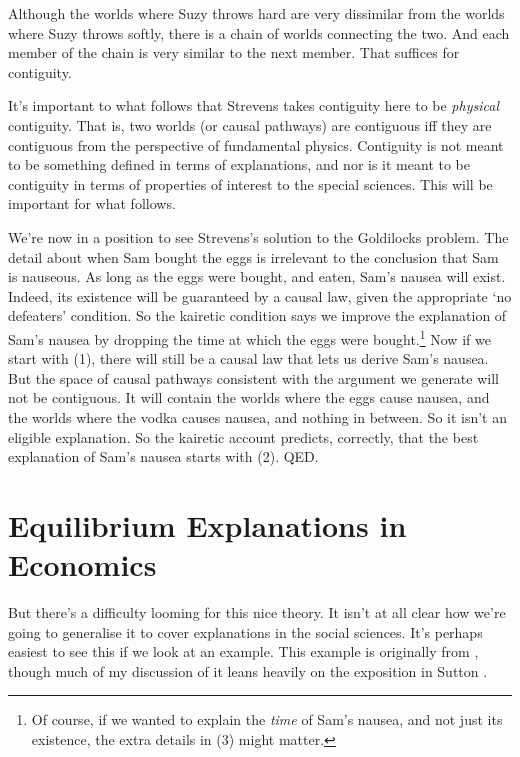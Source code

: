 \noindent Although the worlds where Suzy throws hard are very dissimilar from the worlds where Suzy throws softly, there is a chain of worlds connecting the two. And each member of the chain is very similar to the next member. That suffices for contiguity.

It's important to what follows that Strevens takes contiguity here to be \textit{physical} contiguity. That is, two worlds (or causal pathways) are contiguous iff they are contiguous from the perspective of fundamental physics. Contiguity is not meant to be something defined in terms of explanations, and nor is it meant to be contiguity in terms of properties of interest to the special sciences. This will be important for what follows.

We're now in a position to see Strevens's solution to the Goldilocks problem. The detail about when Sam bought the eggs is irrelevant to the conclusion that Sam is nauseous. As long as the eggs were bought, and eaten, Sam's nausea will exist. Indeed, its existence will be guaranteed by a causal law, given the appropriate `no defeaters' condition. So the kairetic condition says we improve the explanation of Sam's nausea by dropping the time at which the eggs were bought.\footnote{Of course, if we wanted to explain the \textit{time} of Sam's nausea, and not just its existence, the extra details in (3) might matter.} Now if we start with (1), there will still be a causal law that lets us derive Sam's nausea. But the space of causal pathways consistent with the argument we generate will not be contiguous. It will contain the worlds where the eggs cause nausea, and the worlds where the vodka causes nausea, and nothing in between. So it isn't an eligible explanation. So the kairetic account predicts, correctly, that the best explanation of Sam's nausea starts with (2). QED.

\section{Equilibrium Explanations in Economics}

But there's a difficulty looming for this nice theory. It isn't at all clear how we're going to generalise it to cover explanations in the social sciences. It's perhaps easiest to see this if we look at an example. This example is originally from \citet{HendricksPorter1988}, though much of my discussion of it leans heavily on the exposition in Sutton \citeyearpar[47-56]{Sutton2000}.

